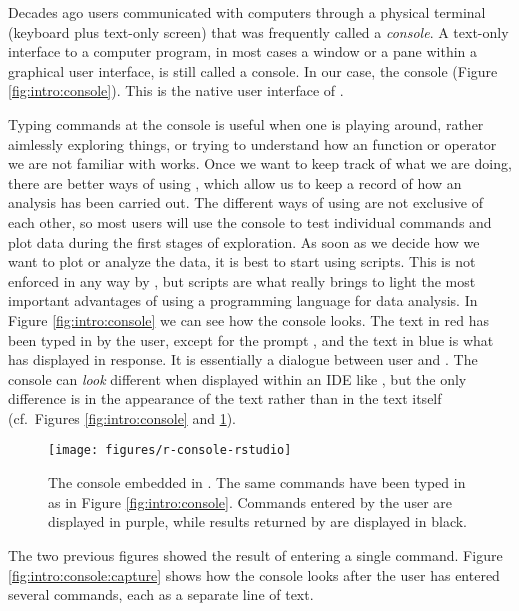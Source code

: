 \documentclass[krantz2]{krantz}\usepackage{knitr}
\begin{document}
Decades ago users communicated with computers through a physical terminal (keyboard plus text-only screen) that was frequently called a \emph{console}. A text-only interface to a computer program, in most cases a window or a pane within a graphical user interface, is still called a console. In our case, the \Rpgrm console (Figure \ref{fig:intro:console}). This is the native user interface of \Rpgrm.

Typing commands at the \Rpgrm console is useful when one is playing around, rather aimlessly exploring things, or trying to understand how an \Rpgrm function or operator we are not familiar with works. Once we want to keep track of what we are doing, there are better ways of using \Rpgrm, which allow us to keep a record of how an analysis has been carried out. The different ways of using \Rpgrm are not exclusive of each other, so most users will use the \Rpgrm console to test individual commands and plot data during the first stages of exploration. As soon as we decide how we want to plot or analyze the data, it is best to start using scripts. This is not enforced in any way by \Rpgrm, but scripts are what really brings to light the most important advantages of using a programming language for data analysis. In Figure \ref{fig:intro:console} we can see how the \Rpgrm console looks. The text in red has been typed in by the user, except for the prompt \code{\textcolor{red}{$>$}}, and the text in blue is what \Rpgrm has displayed in response. It is essentially a dialogue between user and \Rpgrm. The console can \emph{look} different when displayed within an IDE like \RStudio, but the only difference is in the appearance of the text rather than in the text itself (cf.\ Figures \ref{fig:intro:console} and \ref{fig:intro:console:rstudio}).

\begin{figure}
  \centering
  \texttt{[image: figures/r-console-rstudio]}
  \caption[The R console]{The \Rpgrm console embedded in \RStudio. The same commands have been typed in as in Figure \ref{fig:intro:console}. Commands entered by the user are displayed in purple, while results returned by \Rpgrm are displayed in black.}\label{fig:intro:console:rstudio}
\end{figure}

The two previous figures showed the result of entering a single command. Figure \ref{fig:intro:console:capture} shows how the console looks after the user has entered several commands, each as a separate line of text.
\end{document}
